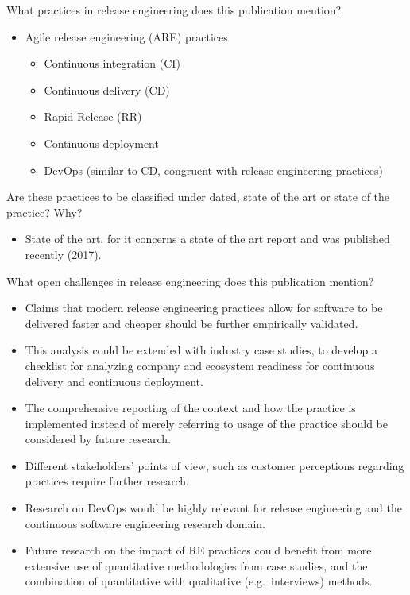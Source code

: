 \documentclass[]{book}
\providecommand{\tightlist}{%
  \setlength{\itemsep}{0pt}\setlength{\parskip}{0pt}}
\begin{document}
What practices in release engineering does this publication mention?

\begin{itemize}
\tightlist
\item
  Agile release engineering (ARE) practices

  \begin{itemize}
  \tightlist
  \item
    Continuous integration (CI)
  \item
    Continuous delivery (CD)
  \item
    Rapid Release (RR)
  \item
    Continuous deployment
  \item
    DevOps (similar to CD, congruent with release engineering practices)
  \end{itemize}
\end{itemize}

Are these practices to be classified under dated, state of the art or
state of the practice? Why?

\begin{itemize}
\tightlist
\item
  State of the art, for it concerns a state of the art report and was
  published recently (2017).
\end{itemize}

What open challenges in release engineering does this publication
mention?

\begin{itemize}
\tightlist
\item
  Claims that modern release engineering practices allow for software to
  be delivered faster and cheaper should be further empirically
  validated.
\item
  This analysis could be extended with industry case studies, to develop
  a checklist for analyzing company and ecosystem readiness for
  continuous delivery and continuous deployment.
\item
  The comprehensive reporting of the context and how the practice is
  implemented instead of merely referring to usage of the practice
  should be considered by future research.
\item
  Different stakeholders' points of view, such as customer perceptions
  regarding practices require further research.
\item
  Research on DevOps would be highly relevant for release engineering
  and the continuous software engineering research domain.
\item
  Future research on the impact of RE practices could benefit from more
  extensive use of quantitative methodologies from case studies, and the
  combination of quantitative with qualitative (e.g.~interviews)
  methods.
\end{itemize}
\end{document}
